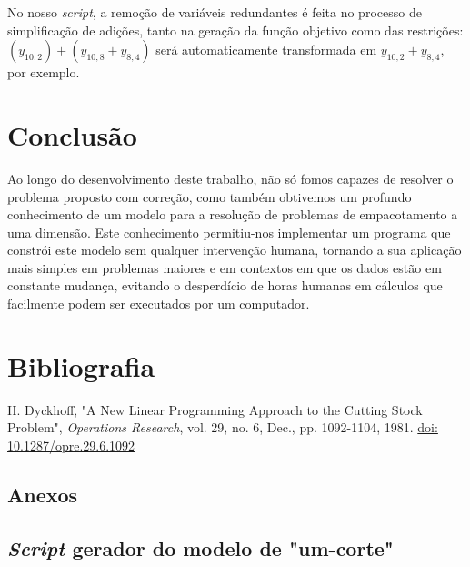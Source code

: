 \documentclass[12pt, a4paper, titlepage]{article}
\begin{document}
No nosso \emph{script}, a remoção de variáveis redundantes é feita no processo de simplificação de
adições, tanto na geração da função objetivo como das restrições:
$(y_{10, 2}) + (y_{10, 8} + y_{8, 4})$ será automaticamente transformada em $y_{10, 2} + y_{8, 4}$,
por exemplo.

\section{Conclusão}

Ao longo do desenvolvimento deste trabalho, não só fomos capazes de resolver o problema proposto
com correção, como também obtivemos um profundo conhecimento de um modelo para a resolução de
problemas de empacotamento a uma dimensão. Este conhecimento permitiu-nos implementar um programa
que constrói este modelo sem qualquer intervenção humana, tornando a sua aplicação mais simples em
problemas maiores e em contextos em que os dados estão em constante mudança, evitando o desperdício
de horas humanas em cálculos que facilmente podem ser executados por um computador.

\section{Bibliografia}
\def\refname{}
\vspace{-1.5cm}
\begin{thebibliography}{9}
    H. Dyckhoff, "A New Linear Programming Approach to the Cutting Stock Problem",
    \emph{Operations Research}, vol. 29, no. 6, Dec., pp. 1092-1104, 1981.
    \href{https://doi.org/10.1287/opre.29.6.1092}{doi: 10.1287/opre.29.6.1092}
\end{thebibliography}

\begin{landscape}
    \section{Anexos}

    \subsection{\emph{Script} gerador do modelo de "um-corte"{}}
    \label{code:one-cut}
    
    \pagebreak
\end{landscape}
\end{document}
